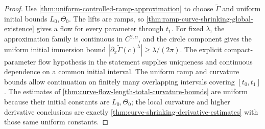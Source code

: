 \begin{proof}
Use \ref{thm:uniform-controlled-ramp-approximation} to choose
$\widetilde\Gamma$ and uniform initial bounds $L_0,\Theta_0$.  The lifts are
ramps, so \ref{thm:ramp-curve-shrinking-global-existence} gives a flow for
every parameter through $t_1$.  For fixed $\lambda$, the approximation family
is continuous in $C^{2,\alpha}$, and the circle component gives the uniform
initial immersion bound $|\partial_x\widetilde\Gamma(c)^\lambda|
\ge\lambda/(2\pi)$.  The explicit compact-parameter flow hypothesis in the
statement supplies uniqueness and continuous dependence on a common initial
interval.  The uniform ramp and curvature bounds allow continuation on
finitely many overlapping intervals covering $[t_0,t_1]$.  The estimates of
\ref{thm:curve-flow-length-total-curvature-bounds} are uniform because their
initial constants are $L_0,\Theta_0$; the local curvature and higher
derivative conclusions are exactly
\ref{thm:curve-shrinking-derivative-estimates} with those same uniform
constants.
\end{proof}
